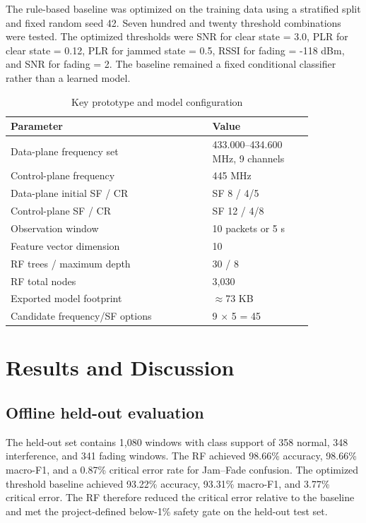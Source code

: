 \documentclass[10pt,a4paper]{article}
\begin{document}
The rule-based baseline was optimized on the training data using a stratified split and fixed random seed 42. Seven hundred and twenty threshold combinations were tested. The optimized thresholds were SNR for clear state = 3.0, PLR for clear state = 0.12, PLR for jammed state = 0.5, RSSI for fading = -118 dBm, and SNR for fading = 2. The baseline remained a fixed conditional classifier rather than a learned model.

\begin{table}[htbp]
\centering
\caption{Key prototype and model configuration}
\label{tab:config}
\fontsize{8}{9.2}\selectfont
\begin{tabular}{p{0.57\linewidth} p{0.28\linewidth}}
\toprule
\textbf{Parameter} & \textbf{Value} \\
\midrule
Data-plane frequency set & 433.000--434.600 MHz, 9 channels \\
Control-plane frequency & 445 MHz \\
Data-plane initial SF / CR & SF 8 / 4/5 \\
Control-plane SF / CR & SF 12 / 4/8 \\
Observation window & 10 packets or 5 s \\
Feature vector dimension & 10 \\
RF trees / maximum depth & 30 / 8 \\
RF total nodes & 3,030 \\
Exported model footprint & $\approx$73 KB \\
Candidate frequency/SF options & 9 $\times$ 5 = 45 \\
\bottomrule
\end{tabular}
\end{table}

\section{Results and Discussion}
\subsection{Offline held-out evaluation}
The held-out set contains 1,080 windows with class support of 358 normal, 348 interference, and 341 fading windows. The RF achieved 98.66\% accuracy, 98.66\% macro-F1, and a 0.87\% critical error rate for Jam--Fade confusion. The optimized threshold baseline achieved 93.22\% accuracy, 93.31\% macro-F1, and 3.77\% critical error. The RF therefore reduced the critical error relative to the baseline and met the project-defined below-1\% safety gate on the held-out test set.
\end{document}
